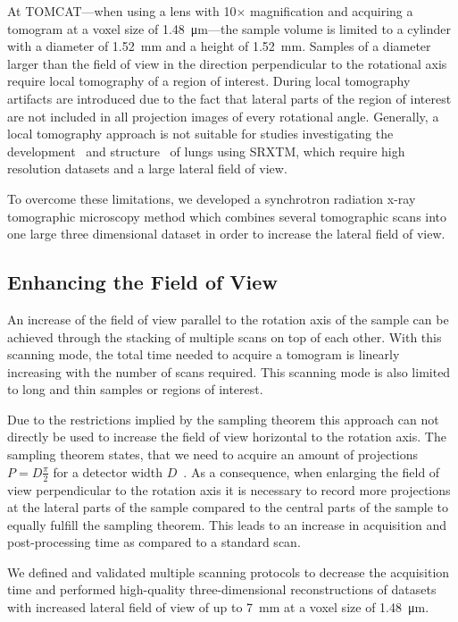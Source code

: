 At TOMCAT---when using a lens with 10$\times$ magnification and acquiring a tomogram at a voxel size of \SI{1.48}{\micro\meter}---the sample volume is limited to a cylinder with a diameter of \SI{1.52}{\milli\meter} and a height of \SI{1.52}{\milli\meter}. Samples of a diameter larger than the field of view in the direction perpendicular to the rotational axis require local tomography of a region of interest. During local tomography artifacts are introduced due to the fact that lateral parts of the region of interest are not included in all projection images of every rotational angle. Generally, a local tomography approach is not suitable for studies investigating the development~\cite{Schittny2008,Mund2008} and structure~\cite{Tsuda2008} of lungs using SRXTM, which require high resolution datasets and a large lateral field of view.

To overcome these limitations, we developed a synchrotron radiation x-ray tomographic microscopy method which combines several tomographic scans into one large three dimensional dataset in order to increase the lateral field of view.

\subsection{Enhancing the Field of View}\label{subsec:enhancing the field of view}%
An increase of the field of view parallel to the rotation axis of the sample can be achieved through the stacking of multiple scans on top of each other. With this scanning mode, the total time needed to acquire a tomogram is linearly increasing with the number of scans required. This scanning mode is also limited to long and thin samples or regions of interest.

Due to the restrictions implied by the sampling theorem this approach can not directly be used to increase the field of view horizontal to the rotation axis. The sampling theorem states, that we need to acquire an amount of projections $P=D\frac{\pi}{2}$ for a detector width $D$~\cite[page 186]{Kak2002}. As a consequence, when enlarging the field of view perpendicular to the rotation axis it is necessary to record more projections at the lateral parts of the sample compared to the central parts of the sample to equally fulfill the sampling theorem. This leads to an increase in acquisition and post-processing time as compared to a standard scan.

We defined and validated multiple scanning protocols to decrease the acquisition time and performed high-quality three-dimensional reconstructions of datasets with increased lateral field of view of up to \SI{7}{\milli\meter} at a voxel size of \SI{1.48}{\micro\meter}.
